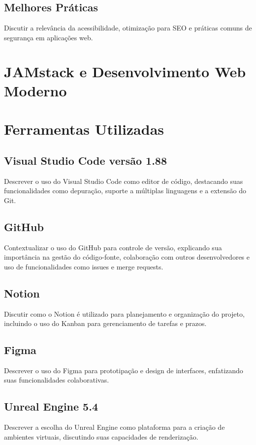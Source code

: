 \subsection{Melhores Práticas}
Discutir a relevância da acessibilidade, otimização para SEO e práticas comuns de segurança em aplicações web.


\section{JAMstack e Desenvolvimento Web Moderno}
\label{sec:jamstack}


\section{Ferramentas Utilizadas}
\subsection{Visual Studio Code versão 1.88}
Descrever o uso do Visual Studio Code como editor de código, destacando suas funcionalidades como depuração, suporte a múltiplas linguagens e a extensão do Git.

\subsection{GitHub}
Contextualizar o uso do GitHub para controle de versão, explicando sua importância na gestão do código-fonte, colaboração com outros desenvolvedores e uso de funcionalidades como issues e merge requests.

\subsection{Notion}
Discutir como o Notion é utilizado para planejamento e organização do projeto, incluindo o uso do Kanban para gerenciamento de tarefas e prazos.

\subsection{Figma}
Descrever o uso do Figma para prototipação e design de interfaces, enfatizando suas funcionalidades colaborativas.


\subsection{Unreal Engine 5.4}
Descrever a escolha do Unreal Engine como plataforma para a criação de ambientes virtuais, discutindo suas capacidades de renderização.

